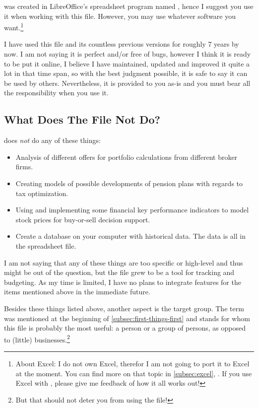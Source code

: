 \tfn was created in LibreOffice's spreadsheet program named , hence I suggest you use it when working with this file.
However, you may use whatever software you want.\footnote{About Excel: I do not own Excel, therefor I am not going to port it to Excel at the moment.
You can find more on that topic in \autoref{subsec:excel}, .
If you use Excel with \tfn, please give me feedback of how it all works out!}

I have used this file and its countless previous versions for roughly 7 years by now.
I am not saying it is perfect and/or free of bugs, however I think it is ready to be put it online, 
I believe I have maintained, updated and improved it quite a lot in that time span, so with the best judgment possible, it is safe to say it can be used by others.
Nevertheless, it is provided to you as-is and you must bear all the responsibility when you use it.

\subsection{What Does The File Not Do?}
\label{subsec:not-included}

\tfn does \emph{not} do any of these things:
\begin{itemize}
	\item Analysis of different offers for portfolio calculations from different broker firms.
	\item Creating models of possible developments of pension plans with regards to tax optimization.
	\item Using and implementing some financial key performance indicators to model stock prices for buy-or-sell decision support.
	\item Create a database on your computer with historical data.
	The data is all in the spreadsheet file.
\end{itemize}
I am not saying that any of these things are too specific or high-level and thus might be out of the question, but the file grew to be a tool for tracking and budgeting.
As my time is limited, I have no plans to integrate features for the items mentioned above in the immediate future.

Besides these things listed above, another aspect is the target group.
The term  was mentioned at the beginning of \autoref{subsec:first-things-first} and stands for whom this file is probably the most useful: a person or a group of persons, as opposed to (little) businesses.\footnote{But that should not deter you from using the file!}

